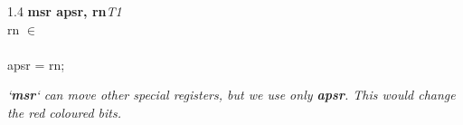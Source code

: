 


\begin{instructionblock}{1.4\imagewidth}%
\textbf{msr apsr, rn}\hfill\textit{T1}\\
    rn $\in$ \extendedregisters\\
    {}\\
    apsr = rn;\vspace{0.5em}

    \itshape
    `\textbf{msr}` can move other special registers, but we use only
    \textbf{apsr}.
    This would change the red coloured bits.
\end{instructionblock}

